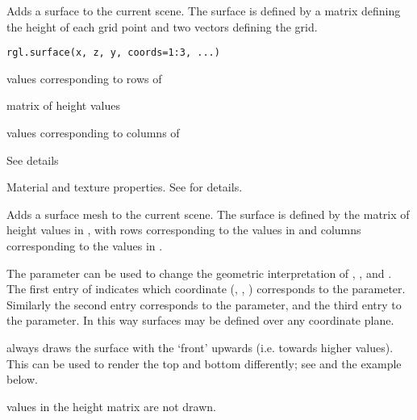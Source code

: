 \documentclass{article}
\begin{document}
\begin{Description}\relax
Adds a surface to the current scene. The surface is defined by 
a matrix defining the height of each grid point and two vectors
defining the grid.
\end{Description}
\begin{Usage}
\begin{verbatim}
rgl.surface(x, z, y, coords=1:3, ...)
\end{verbatim}
\end{Usage}
\begin{Arguments}
\begin{ldescription}
\item[\code{ x }] values corresponding to rows of 

\item[\code{ y }] matrix of height values

\item[\code{ z }] values corresponding to columns of 

\item[\code{ coords }] See details

\item[\code{ ... }] Material and texture properties. See  for details.
\end{ldescription}
\end{Arguments}
\begin{Details}\relax
Adds a surface mesh to the current scene. The surface is defined by 
the matrix of height values in , with rows corresponding 
to the values in  and columns corresponding to the values in 
.

The  parameter can be used to change the geometric
interpretation of , , and .  The first entry 
of  indicates which coordinate (, 
, ) corresponds to the  parameter.
Similarly the second entry corresponds to the  parameter,
and the third entry to the  parameter.  In this way 
surfaces may be defined over any coordinate plane.

 always draws the surface with the `front' upwards
(i.e. towards higher  values).  This can be used to render
the top and bottom differently; see  and
the example below.

 values in the height matrix are not drawn.
\end{Details}
\end{document}
